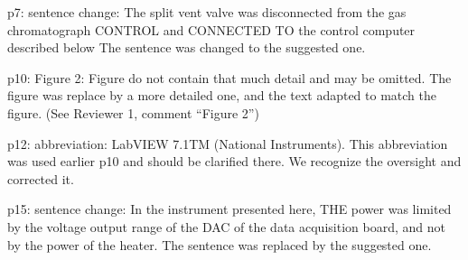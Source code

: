 \documentclass[10pt]{article}
\begin{document}
\begin{response}{p7: sentence change: The split vent valve was disconnected from
the gas chromatograph CONTROL and CONNECTED TO the control computer described
below 
	}  The sentence was changed to the suggested one. 
\end{response}

\begin{response}{p10: Figure 2: Figure do not contain that much detail and may
be omitted.
	}  The figure was replace by a more detailed one, and the text adapted to match
	the figure. (See Reviewer 1, comment ``Figure 2'')
\end{response}

\begin{response}{p12: abbreviation: LabVIEW 7.1TM (National Instruments). This
abbreviation was used earlier p10 and should be clarified there.
	}  We recognize the oversight and corrected it.
\end{response}

\begin{response}{p15: sentence change: In the instrument presented here, THE
power was limited by the voltage output range of the DAC of the data acquisition
board, and not by the power of the heater.
	}  The sentence was replaced by the suggested one.
\end{response}
\end{document}
